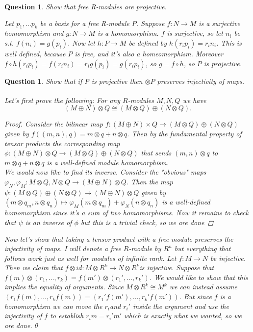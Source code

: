 \documentclass[a4paper]{article}
\newtheorem{que}[thm]{Question}
\begin{document}
\begin{que} Show that free R-modules are projective.
	
	Let $p_1, ... p_k$ be a basis for a free R-module $P$. Suppose $f : N \to M$ is a surjective homomorphism and $g: N \to M$ is a homomorphism. $f$ is surjective, so let $n_i$ be s.t. $f(n_i) = g(p_i)$. 
	Now let $h : P \to M$ be defined by $h(r_i p_i)=r_i n_i$. This is well defined, because $P$ is free, and it's also a homeomorphism. Moreover $f \circ h(r_i p_i) = f(r_i n_i) = r_i g(p_i) = g(r_i p_i)$, so $g = f \circ h$, so $P$ is projective.
\end{que}
\begin{que} Show that if P is projective then $\otimes P$ preserves injectivity of maps.\\ \\
    Let's first prove the following: For any $R$-modules $M,N,Q$ we have  \[
        \left( M \oplus N \right)\otimes Q \cong \left( M\otimes Q \right) \oplus \left( N\otimes Q \right) 
    .\] 
    \begin{proof}
        Consider the bilinear map $f:\left( M\oplus N \right) \times Q\to \left( M\otimes Q \right) \oplus \left( N\otimes Q\right) $ given by $f\left( \left( m,n \right), q \right)=m\otimes q+n\otimes q $. Then by the fundamental property of tensor products the corresponding map $\phi:\left( M\oplus N \right) \otimes Q\to \left( M\otimes Q \right) \oplus \left( N\otimes Q  \right) $ that sends $\left( m,n \right) \otimes q$ to $m\otimes q+n\otimes q$ is a well-defined module homomorphism.\\
        We would now like to find its inverse. Consider the "obvious" maps $\varphi_N,\varphi_M:M\otimes Q,N\otimes Q\to \left( M\oplus N \right) \otimes Q$. Then the map $\psi:\left( M\otimes Q \right) \oplus \left( N\otimes Q \right)\to \left( M\oplus N \right) \otimes Q $ given by $\left( m\otimes q_m,n\otimes q_n \right)\mapsto \varphi_M(m\otimes q_m)+\varphi_N\left( n\otimes q_n \right)$ is a well-defined homomorphism since it's a sum of two homomorphisms. Now it remains to check that $\psi$ is an inverse of $\phi$ but this is a trivial check, so we are done
    \end{proof}
    Now let's show that taking a tensor product with a free module preserves the injectivity of maps. I will denote a free $R$-module by $R^{n}$ but everything that follows work just as well for modules of infinite rank. Let $f:M\to N$ be injective. Then we claim that $f\otimes id:M\otimes R^{k}\to N\otimes R^{k}$is injective. Suppose that $f\left( m\right)\otimes \left( r_1, \ldots, r_k \right)=f\left( m'\right)\otimes \left( r_1', \ldots,r_k' \right) $. We would like to show that this implies the equality of arguments. Since $M\otimes R^{k}\cong M^{k}$ we can instead assume $\left( r_1f(m), \ldots, r_kf(m) \right) = \left( r_1'f(m'), \ldots ,r_k'f(m') \right) $. But since $f$ is a homomorphism we can move the $r_i$and  $r_i'$ inside the argument and use the injectivity of $f$ to establish $r_im=r_i'm'$ which is exactly what we wanted, so we are done.\qed\\

\end{que}
\end{document}
